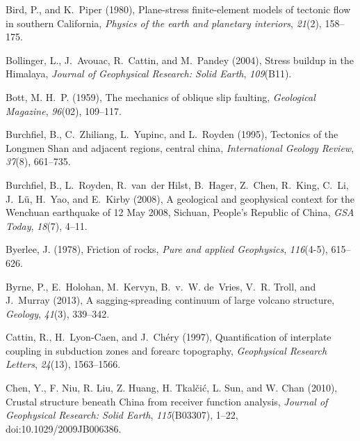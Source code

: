 \documentclass[draft,jgrga]{AGUTeX}
\begin{document}
\begin{article}
\begin{thebibliography}{90}
Bird, P., and K.~Piper (1980), Plane-stress finite-element models of tectonic
  flow in southern {C}alifornia, \textit{Physics of the earth and planetary
  interiors}, \textit{21}(2), 158--175.

Bollinger, L., J.~Avouac, R.~Cattin, and M.~Pandey (2004), Stress buildup in
  the {H}imalaya, \textit{Journal of Geophysical Research: Solid Earth},
  \textit{109}(B11).

Bott, M. H.~P. (1959), The mechanics of oblique slip faulting,
  \textit{Geological Magazine}, \textit{96}(02), 109--117.

Burchfiel, B., C.~Zhiliang, L.~Yupinc, and L.~Royden (1995), Tectonics of the
  {L}ongmen {S}han and adjacent regions, central {}china, \textit{International
  Geology Review}, \textit{37}(8), 661--735.

Burchfiel, B., L.~Royden, R.~van~der Hilst, B.~Hager, Z.~Chen, R.~King, C.~Li,
  J.~L{\"u}, H.~Yao, and E.~Kirby (2008), A geological and geophysical context
  for the {W}enchuan earthquake of 12 {M}ay 2008, {S}ichuan, {P}eople's
  {R}epublic of {C}hina, \textit{GSA Today}, \textit{18}(7), 4--11.

Byerlee, J. (1978), Friction of rocks, \textit{Pure and applied Geophysics},
  \textit{116}(4-5), 615--626.

Byrne, P., E.~Holohan, M.~Kervyn, B.~v.~W. de~Vries, V.~R. Troll, and J.~Murray
  (2013), A sagging-spreading continuum of large volcano structure,
  \textit{Geology}, \textit{41}(3), 339--342.

Cattin, R., H.~Lyon-Caen, and J.~Ch{\'e}ry (1997), Quantification of interplate
  coupling in subduction zones and forearc topography, \textit{Geophysical
  Research Letters}, \textit{24}(13), 1563--1566.

Chen, Y., F. Niu, R. Liu, Z. Huang, H. Tkal{\v{c}}i{\'c}, L. Sun, and
  W. Chan (2010), Crustal structure beneath {C}hina from receiver function
  analysis, \textit{Journal of Geophysical Research: Solid Earth}, 
  \textit{115}(B03307), 1--22, doi:10.1029/2009JB006386.


\end{thebibliography}
\end{article}
\end{document}
